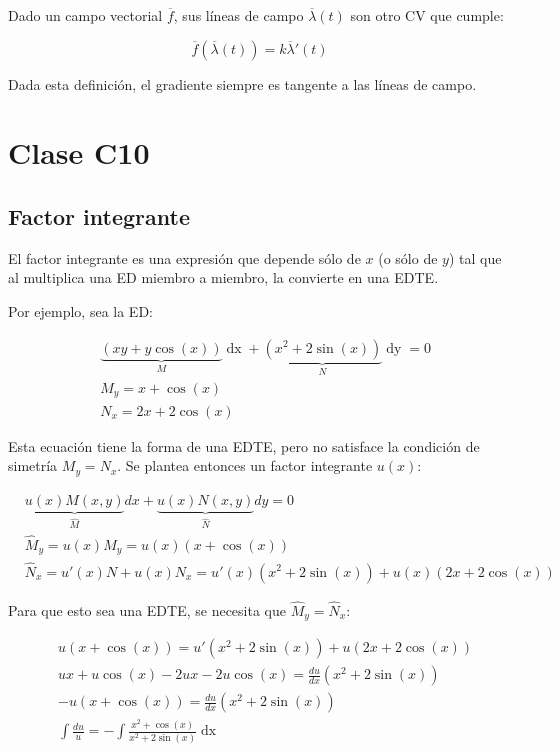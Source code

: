 \documentclass{article}
\begin{document}
Dado un campo vectorial $\overline{f}$, sus líneas de campo $\overline{\lambda}(t)$ son otro CV que cumple:

\begin{equation}
\overline{f}(\overline{\lambda}(t)) = k \overline{\lambda}'(t)
\end{equation}

Dada esta definición, el gradiente siempre es tangente a las líneas de campo.

\section{Clase C10}

\subsection{Factor integrante}

El factor integrante es una expresión que depende sólo de $x$ (o sólo de $y$) tal que al multiplica una ED miembro a miembro, la convierte en una EDTE.

Por ejemplo, sea la ED:

\begin{align}
& \underbrace{ (xy + y \cos(x)) }_{M} \mathop{dx} + \underbrace{ (x^2 + 2 \sin(x)) }_N \mathop{dy} = 0 \\
& M_y = x + \cos(x) \\
& N_x = 2x + 2 \cos(x)
\end{align}

Esta ecuación tiene la forma de una EDTE, pero no satisface la condición de simetría $M_y = N_x$. Se plantea entonces un factor integrante $u(x)$:

\begin{align}
& \underbrace{ u(x) M(x,y) }_{\hat{M}} dx + \underbrace{ u(x) N(x,y) }_{\hat{N}} dy = 0 \\ 
& \hat{M}_y = u(x) M_y = u(x) (x + \cos(x)) \\
& \hat{N}_x = u'(x) N + u(x) N_x = u'(x) (x^2 + 2 \sin(x)) + u(x) (2x + 2 \cos(x))  
\end{align}

Para que esto sea una EDTE, se necesita que $\hat{M}_y = \hat{N}_x$:

\begin{align}
& u (x + \cos(x)) = u' (x^2 + 2 \sin(x)) + u (2x + 2 \cos(x)) \\
& u x + u \cos(x) - 2 u x -2 u \cos(x) = \frac{du}{dx} \left( x^2 + 2 \sin(x) \right) \\
& -u (x + \cos(x)) = \frac{du}{dx} \left( x^2 + 2 \sin(x) \right) \\
& \int \frac{du}{u} = -\int \frac{x^2 + \cos(x)}{x^2 + 2 \sin(x)} \mathop{dx}
\end{align}
\end{document}
